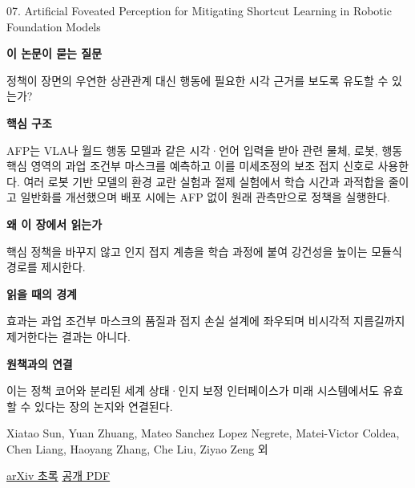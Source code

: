 \documentclass[11pt,openany]{book}
\begin{document}
\begin{termcard}{07. Artificial Foveated Perception for Mitigating Shortcut Learning in Robotic Foundation Models}

\par

\medskip

{\sffamily\bfseries\color{deepblue} 이 논문이 묻는 질문}\par

정책이 장면의 우연한 상관관계 대신 행동에 필요한 시각 근거를 보도록 유도할 수 있는가?

\smallskip

{\sffamily\bfseries\color{deepblue} 핵심 구조}\par

AFP는 VLA나 월드 행동 모델과 같은 시각·언어 입력을 받아 관련 물체, 로봇, 행동 핵심 영역의 과업 조건부 마스크를 예측하고 이를 미세조정의 보조 접지 신호로 사용한다. 여러 로봇 기반 모델의 환경 교란 실험과 절제 실험에서 학습 시간과 과적합을 줄이고 일반화를 개선했으며 배포 시에는 AFP 없이 원래 관측만으로 정책을 실행한다.

\smallskip

{\sffamily\bfseries\color{deepblue} 왜 이 장에서 읽는가}\par

핵심 정책을 바꾸지 않고 인지 접지 계층을 학습 과정에 붙여 강건성을 높이는 모듈식 경로를 제시한다.

\smallskip

{\sffamily\bfseries\color{coral} 읽을 때의 경계}\par

효과는 과업 조건부 마스크의 품질과 접지 손실 설계에 좌우되며 비시각적 지름길까지 제거한다는 결과는 아니다.

\smallskip

{\sffamily\bfseries\color{teal} 원책과의 연결}\par

이는 정책 코어와 분리된 세계 상태·인지 보정 인터페이스가 미래 시스템에서도 유효할 수 있다는 장의 논지와 연결된다.

\medskip

{\footnotesize\color{muted} Xiatao Sun, Yuan Zhuang, Mateo Sanchez Lopez Negrete, Matei-Victor Coldea, Chen Liang, Haoyang Zhang, Che Liu, Ziyao Zeng 외\par

\href{https://arxiv.org/abs/2607.10655}{arXiv 초록} \quad \href{https://arxiv.org/pdf/2607.10655}{공개 PDF}\par}

\end{termcard}
\end{document}
